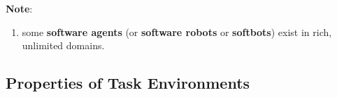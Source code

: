 \vspace{0.3cm}

\textbf{Note}:
\begin{enumerate}
    \item some \textbf{software agents} (or \textbf{software robots} or \textbf{softbots}) exist in rich, unlimited domains. 
    \hfill \cite{ai/book/Artificial-Intelligence-A-Modern-Approach/Russell-Norvig}

    
\end{enumerate}


\subsection{Properties of Task Environments \cite{ai/book/Artificial-Intelligence-A-Modern-Approach/Russell-Norvig}}

